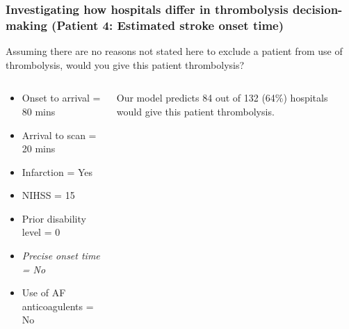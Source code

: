 \documentclass{beamer}
\begin{document}
\begin{frame}
\frametitle{Investigating how hospitals differ in thrombolysis decision-making (Patient 4: Estimated stroke onset time)}

Assuming there are no reasons not stated here to exclude a patient from use of thrombolysis, would you give this patient thrombolysis?

\vspace{3mm}

\begin{columns}
    \begin{column}{0.5\textwidth}
        \begin{itemize}
            \item Onset to arrival = 80 mins
            \item Arrival to scan = 20 mins
            \item Infarction = Yes
            \item NIHSS = 15
            \item Prior disability level = 0
            \item \emph{Precise onset time = No}
            \item Use of AF anticoagulents = No
        \end{itemize}
    \end{column}
    
    \begin{column}{0.4\textwidth}
    Our model predicts 84 out of 132 (64\%) hospitals would give this patient thrombolysis.
    \end{column}

\end{columns}
\end{frame}


\end{document}
